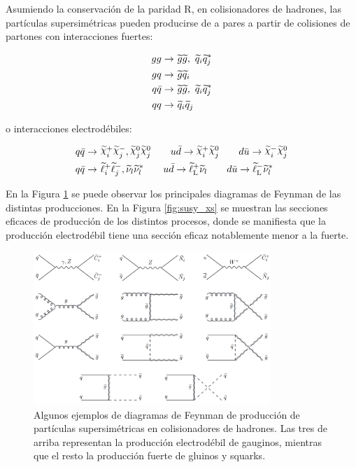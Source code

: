 Asumiendo la conservación de la paridad R, en colisionadores de hadrones, las partículas supersimétricas pueden producirse de a pares a partir de colisiones de partones con interacciones fuertes:

\begin{equation}
	\begin{split}
		gg\to &\ \widetilde{g}\widetilde{g},\ \widetilde{q}_i\widetilde{q}_j^* \\ 
		gq\to &\ \widetilde{g}\widetilde{q}_i \\ 
		q\bar{q}\to &\ \widetilde{g}\widetilde{g},\ \widetilde{q}_i\widetilde{q}_j^* \\ 
		qq\to &\ \widetilde{q}_i\widetilde{q}_j \\ 
	\end{split}
\end{equation}

\noindent
o interacciones electrodébiles:

\begin{equation}
	\begin{split}
		q\bar{q}\to &\ \ggino_i^+\ggino_j^-,\ggino_j^0\ggino_j^0 \quad\quad u\bar{d}\to\ggino_i^+\ggino_j^0 \quad\quad d\bar{u}\to\ggino_i^-\ggino_j^0 \\
		q\bar{q}\to &\ \slepton_i^{+}\slepton_j^{-},\snu_l\snu_l^* \quad\quad u\bar{d}\to\sleptonL^{+}\snu_l \quad\quad d\bar{u}\to\sleptonL^{-}\snu_l^* \\
	\end{split}
\end{equation}

En la Figura \ref{fig:sp_production} se puede observar los principales diagramas de Feynman de las distintas producciones. En la Figura \ref{fig:susy_xs} se muestran las secciones eficaces de producción de los distintos procesos, donde se manifiesta que la producción electrodébil tiene una sección eficaz notablemente menor a la fuerte.

\begin{figure}
  \centering
  \includegraphics[width=0.8\textwidth]{images/theory/sp_production.png}
  \caption{Algunos ejemplos de diagramas de Feynman de producción de partículas supersimétricas en colisionadores de hadrones. Las tres de arriba representan la producción electrodébil de gauginos, mientras que el resto la producción fuerte de gluinos y squarks.}
  \label{fig:sp_production}
\end{figure}

